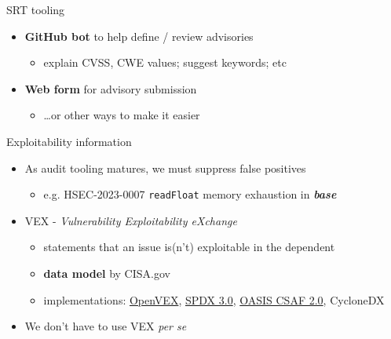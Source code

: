\documentclass[ignorenonframetext,aspectratio=169,12pt]{beamer}
\begin{document}
\begin{frame}{SRT tooling}
  \begin{itemize}
    \item {\bf GitHub bot} to help define / review advisories
      \begin{itemize}
        \item explain CVSS, CWE values; suggest keywords; etc
      \end{itemize}
    \item {\bf Web form} for advisory submission
      \begin{itemize}
        \item \ldots{}or other ways to make it easier
      \end{itemize}
  \end{itemize}
\end{frame}

\begin{frame}{Exploitability information}
  \begin{itemize}
    \item As audit tooling matures, we must suppress false positives
      \begin{itemize}
        \item e.g. HSEC-2023-0007 {\tt readFloat} memory exhaustion
          in {\em \textbf{base}}
      \end{itemize}
      
    \item VEX - {\em Vulnerability Exploitability eXchange}
      \begin{itemize}
        \item statements that an issue is(n't) exploitable in the
          dependent
        \item {\bf data model} by CISA.gov
        \item implementations:
          \href{https://github.com/openvex/spec}{OpenVEX},
          \href{https://spdx.dev/capturing-software-vulnerability-data-in-spdx-3-0/}{SPDX 3.0},
          \href{https://www.oasis-open.org/2022/11/21/new-version-of-csaf-standard/}{OASIS CSAF 2.0},
          CycloneDX 
      \end{itemize}
    \item We don't have to use VEX {\em per se}
  \end{itemize}
\end{frame}
\end{document}
